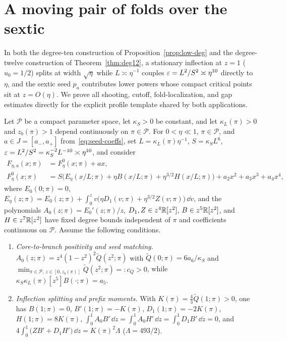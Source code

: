 \section{A moving pair of folds over the sextic}\label{subsec:deg10}
In both the degree-ten construction of Proposition~\ref{prop:low-deg} and the degree-twelve construction of Theorem~\ref{thm:deg12}, a stationary inflection at $z=1$ ($u_0=1/2$) splits at width $\sqrt\eta$ while $L\asymp\eta^{-1}$ couples $\varepsilon=L^2/S^2\asymp\eta^{10}$ directly to $\eta$, and the sextic seed $p_a$ contributes lower powers whose compact critical points sit at $z=O(\eta)$. We prove all shooting, cutoff, fold-localization, and gap estimates directly for the explicit profile template shared by both applications.

\begin{proposition}\label{prop:moving-layer}
Let $\mathcal{P}$ be a compact parameter space, let $\kappa_S>0$ be constant, and let $\kappa_L(\pi)>0$ and $z_b(\pi)>1$ depend continuously on $\pi\in\mathcal{P}$. For $0<\eta\ll 1$, $\pi\in\mathcal{P}$, and $a\in J=[a_-,a_+]$ from~\eqref{eq:seed-coeffs}, set $L=\kappa_L(\pi)\eta^{-1}$, $S=\kappa_S L^6$, $\varepsilon=L^2/S^2=\kappa_S^{-2}L^{-10}\asymp\eta^{10}$, and consider
\begin{equation}\label{eq:seeded-template}
  \begin{aligned}
    F_{\eta,a}(x;\pi) &= F_\eta^0(x;\pi) + ax,\\
    F_\eta^0(x;\pi)   &= S\Big(E_\eta(x/L;\pi) + \eta B(x/L;\pi) + \eta^{3/2}H(x/L;\pi)\Big) + a_2 x^2 + a_3 x^3 + a_4 x^4,
  \end{aligned}
\end{equation}
where $E_0(0;\pi)=0$, $E_\eta(z;\pi)=E_0(z;\pi)+\int_0^z v\big(\eta D_1(v;\pi)+\eta^{3/2}Z(v;\pi)\big)\,\dd v$, and the polynomials $A_0(z;\pi)=E_0'(z;\pi)/z$, $D_1,Z\in z^4\mathbb{R}[z^2]$, $B\in z^5\mathbb{R}[z^2]$, and $H\in z^7\mathbb{R}[z^2]$ have fixed degree bounds independent of $\pi$ and coefficients continuous
on $\mathcal{P}$. Assume the following conditions.
\begin{enumerate}
  \item[\textup{(a)}] \emph{Core-to-branch positivity and seed matching.} $A_0(z;\pi)=z^4(1-z^2)^2\widetilde Q(z^2;\pi)$ with $\widetilde Q(0;\pi)=6a_6/\kappa_S$ and $\min_{\pi\in\mathcal{P},\,z\in[0,z_b(\pi)]}\widetilde Q(z^2;\pi)=:c_Q>0$, while $\kappa_S\kappa_L(\pi)[z^5]B(\cdot;\pi)=a_5$.
  \item[\textup{(b)}] \emph{Inflection splitting and prefix moments.} With $K(\pi)=\frac43\widetilde Q(1;\pi)>0$, one has $B(1;\pi)=0$, $B'(1;\pi)=-K(\pi)$, $D_1(1;\pi)=-2K(\pi)$, $H(1;\pi)=8K(\pi)$, $\int_0^1 A_0 B'\,\dd z=\int_0^1 A_0 H'\,\dd z=\int_0^1 D_1 B'\,\dd z=0$, and $4\int_0^1\big(ZB'+D_1 H'\big)\,\dd z=K(\pi)^2\Lambda$ ($\Lambda=493/2$).

\end{enumerate}
\end{proposition}
